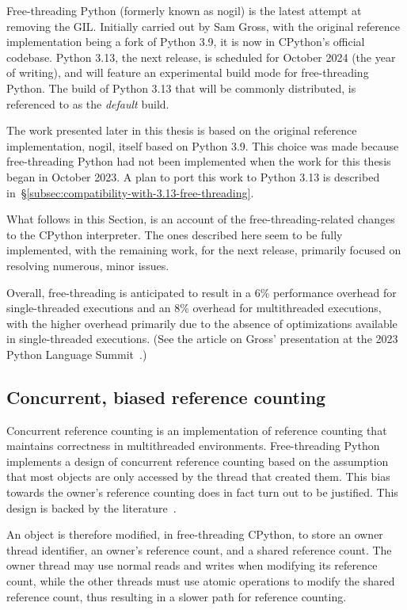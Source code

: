 Free-threading Python (formerly known as nogil) is the latest attempt at removing the GIL\@.
Initially carried out by Sam Gross, with the original reference implementation being a fork of Python 3.9, it is now in CPython's official codebase.
Python 3.13, the next release, is scheduled for October 2024 (the year of writing), and will feature an experimental build mode for free-threading Python.
The build of Python 3.13 that will be commonly distributed, is referenced to as the \emph{default} build.

The work presented later in this thesis is based on the original reference implementation, nogil, itself based on Python 3.9.
This choice was made because free-threading Python had not been implemented when the work for this thesis began in October 2023.
A plan to port this work to Python 3.13 is described in~\S\ref{subsec:compatibility-with-3.13-free-threading}.

What follows in this Section, is an account of the free-threading-related changes to the CPython interpreter.
The ones described here seem to be fully implemented, with the remaining work, for the next release, primarily focused on resolving numerous, minor issues.

Overall, free-threading is anticipated to result in a 6\% performance overhead for single-threaded executions and an 8\% overhead for multithreaded executions, with the higher overhead primarily due to the absence of optimizations available in single-threaded executions.
(See the article on Gross' presentation at the 2023 Python Language Summit~\cite{python-summit-2023-nogil}.)


\subsection{Concurrent, biased reference counting}\label{subsec:concurrent-biased-reference-counting}

Concurrent reference counting is an implementation of reference counting that maintains correctness in multithreaded environments.
Free-threading Python implements a design of concurrent reference counting based on the assumption that most objects are only accessed by the thread that created them.
This bias towards the owner's reference counting does in fact turn out to be justified.
This design is backed by the literature~\cite{biased-refcounting}.

An object is therefore modified, in free-threading CPython, to store an owner thread identifier, an owner's reference count, and a shared reference count.
The owner thread may use normal reads and writes when modifying its reference count, while the other threads must use atomic operations to modify the shared reference count, thus resulting in a slower path for reference counting.

